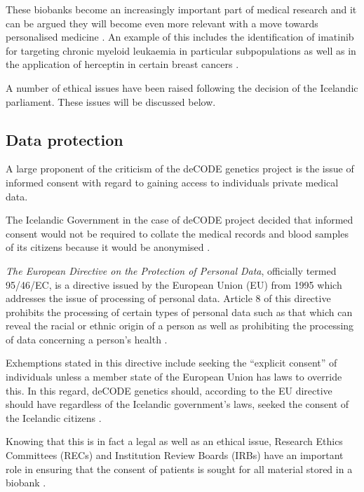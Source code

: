 \documentclass[british,a4paper, 12pt]{article}
\begin{document}
These biobanks become an increasingly important part of medical research and 
it can be argued they will become even more relevant with a move towards 
personalised medicine \parencite{watson2010integrating}. An example of this
includes the identification of imatinib for targeting chronic myeloid leukaemia 
in particular subpopulations \parencite{cohen2002approval} as well as in the
application of herceptin in certain breast cancers \parencite{lemieux2009role}.

A number of ethical issues have been raised 
following the decision of the Icelandic parliament. These issues will be 
discussed below.

\subsection{Data protection}
A large proponent of the criticism of the deCODE genetics project is the issue
of informed consent with regard to gaining access to individuals private
medical data.

The Icelandic Government in the case of deCODE project decided that informed 
consent would not be required to collate the medical records and blood samples 
of its citizens because it would be anonymised \parencite{chadwick1999icelandic}.

\emph{The European Directive on the Protection of Personal Data}, officially 
termed 95/46/EC, is a directive issued by the European Union (EU) from 1995 which 
addresses the issue of processing of personal data. Article 8 of this directive 
prohibits the processing of certain types of personal data such as that which 
can reveal the racial or ethnic origin of a person as well as prohibiting the 
processing of data concerning a person's health \parencite{directive199595}.

Exhemptions stated in this directive include seeking the ``explicit consent'' 
of individuals unless a member state of the European Union has laws to override 
this. In this regard, deCODE genetics should, according to the EU directive 
should have regardless of the Icelandic government's laws, seeked the consent of 
the Icelandic citizens \parencite{carey2009data}.

Knowing that this is in fact a legal as well as an ethical issue, Research Ethics 
Committees (RECs) and Institution Review Boards (IRBs) have an important role in 
ensuring that the consent of patients is sought for all material stored in a 
biobank \parencite{watson2010integrating}.
\end{document}

